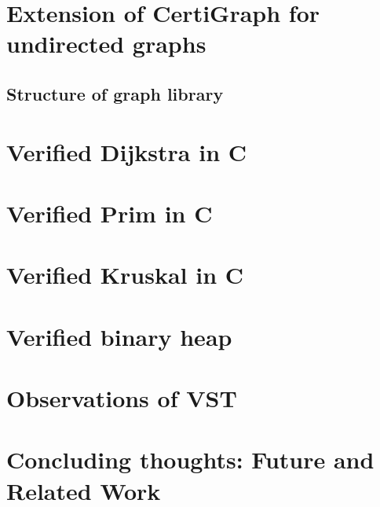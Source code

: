 \documentclass[runningheads]{llncs}
\newcommand\hide[1]{}
\begin{document}
	\section{Extension of CertiGraph for undirected graphs}
	\label{sec:undirected}
	

	\subsection{Structure of graph library}
	\label{sec:structure}
	

	\section{Verified Dijkstra in C}
	\label{sec:dijkstra}
	
	
	\section{Verified Prim in C}
	\label{sec:prim}
	
	
	\section{Verified Kruskal in C}
	\label{sec:kruskal}
	

    \section{Verified binary heap}
    \label{sec:binheap}
    

	\section{Observations of VST}
	\label{sec:vst}
	
	
	
	\section{Concluding thoughts: Future and Related Work}
	\label{sec:conclusion}
	
	
	
	\appendix
	\label{sec:apx}
	
	
\end{document}
